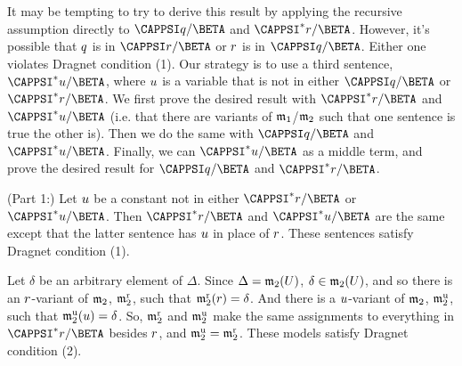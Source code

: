 \begin{PROOF}
\begin{description}
\begin{description}
\begin{SUBPROOF}
	\begin{commentary}
		It may be tempting to try to derive this result by applying the recursive assumption directly to $\CAPPSI\variable{q}/\BETA$ and $\CAPPSI^*\variable{r}/\BETA$.
		However, it's possible that $q$ is in $\CAPPSI\variable{r}/\BETA$ or $r$ is in $\CAPPSI\variable{q}/\BETA$.
		Either one violates Dragnet condition (1).
		\commentaryspace
		Our strategy is to use a third sentence, $\CAPPSI^*\variable{u}/\BETA$, where $u$ is a variable that is not in either $\CAPPSI\variable{q}/\BETA$ or $\CAPPSI^*\variable{r}/\BETA$.
		We first prove the desired result with $\CAPPSI^*\variable{r}/\BETA$ and $\CAPPSI^*\variable{u}/\BETA$ (i.e. that there are variants of $\mathfrak{m}_1$/$\mathfrak{m}_2$ such that one sentence is true \Iff the other is).
		Then we do the same with $\CAPPSI\variable{q}/\BETA$ and $\CAPPSI^*\variable{u}/\BETA$.
		Finally, we can  $\CAPPSI^*\variable{u}/\BETA$ as a middle term, and prove the desired result for $\CAPPSI\variable{q}/\BETA$ and $\CAPPSI^*\variable{r}/\BETA$.
	\end{commentary}


	(Part 1:) Let $u$ be a constant not in either $\CAPPSI^*\variable{r}/\BETA$ or $\CAPPSI^*\variable{u}/\BETA$.
	Then $\CAPPSI^*\variable{r}/\BETA$ and $\CAPPSI^*\variable{u}/\BETA$ are the same except that the latter sentence has $u$ in place of $r$.
	These sentences satisfy Dragnet condition (1).

	Let $\delta$ be an arbitrary element of $\Delta$.
	Since $\Delta=\mathfrak{m}_2(U)$, $\delta\in\mathfrak{m}_2(U)$, and so there is an $r$-variant of $\mathfrak{m}_2$, $\mathfrak{m^{\mathrm{r}}_{\mathrm{2}}}$, such that $\mathfrak{m^{\mathrm{r}}_{\mathrm{2}}}(r)=\delta$.
	And there is a $u$-variant of $\mathfrak{m}_2$, $\mathfrak{m^{\mathrm{u}}_{\mathrm{2}}}$, such that $\mathfrak{m^{\mathrm{u}}_{\mathrm{2}}}(u)=\delta$.
	So, $\mathfrak{m^{\mathrm{r}}_{\mathrm{2}}}$ and $\mathfrak{m^{\mathrm{u}}_{\mathrm{2}}}$ make the same assignments to everything in $\CAPPSI^*\variable{r}/\BETA$ besides $r$, and $\mathfrak{m^{\mathrm{u}}_{\mathrm{2}}}=\mathfrak{m^{\mathrm{r}}_{\mathrm{2}}}$.
	These models satisfy Dragnet condition (2).
	

\end{SUBPROOF}
\end{description}
\end{description}
\end{PROOF}
